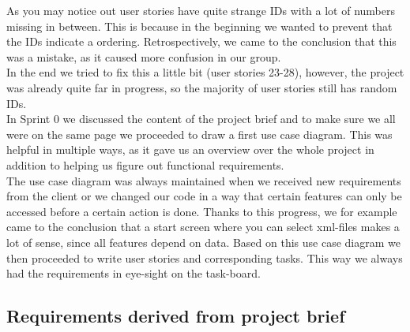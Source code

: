 As you may notice out user stories have quite strange IDs with a lot of numbers missing in between. This is because in the beginning we wanted to prevent that the IDs indicate a ordering. Retrospectively, we came to the conclusion that this was a mistake, as it caused more confusion in our group.\\
In the end we tried to fix this a little bit (user stories 23-28), however, the project was already quite far in progress, so the majority of user stories still has random IDs.  \\
\newline
In Sprint 0 we discussed the content of the project brief and to make sure we all were on the same page we proceeded to draw a first use case diagram. This was helpful in multiple ways, as it gave us an overview over the whole project in addition to helping us figure out functional requirements.\\
The use case diagram was always maintained when we received new requirements from the client or we changed our code in a way that certain features can only be accessed before a certain action is done. Thanks to this progress, we for example came to the conclusion that a start screen where you can select xml-files makes a lot of sense, since all features depend on data.
Based on this use case diagram we then proceeded to write user stories and corresponding tasks. This way we always had the requirements in eye-sight on the task-board.

\subsection{Requirements derived from project brief}
